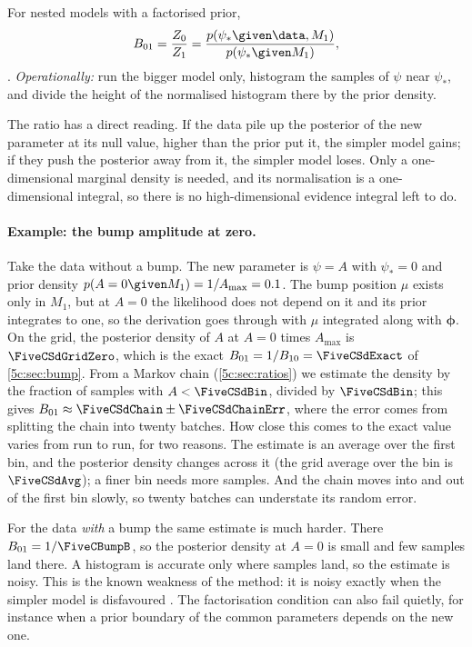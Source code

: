 \begin{workdef}
For nested models with a factorised prior,
\[
  B_{01}=\frac{Z_0}{Z_1}=\frac{p(\psi_*\given\data,M_1)}{p(\psi_*\given M_1)} ,
\]
. \emph{Operationally:} run the bigger model only,
histogram the samples of $\psi$ near $\psi_*$, and divide the height of the normalised
histogram there by the prior density.
\end{workdef}

The ratio has a direct reading. If the data pile up the posterior of the new parameter
at its null value, higher than the prior put it, the simpler model gains; if they push
the posterior away from it, the simpler model loses. Only a one-dimensional marginal
density is needed, and its normalisation is a one-dimensional integral, so there is no
high-dimensional evidence integral left to do.

\paragraph{Example: the bump amplitude at zero.}
Take the data without a bump. The new parameter is $\psi=A$ with $\psi_*=0$ and prior
density $p(A=0\given M_1)=1/A_{\max}=0.1$. The bump position $\mu$ exists only in $M_1$,
but at $A=0$ the likelihood does not depend on it and its prior integrates to one, so
the derivation goes through with $\mu$ integrated along with $\bm\phi$. On the grid,
the posterior density of $A$ at $A=0$ times $A_{\max}$ is $\FiveCSdGridZero$, which is the
exact $B_{01}=1/B_{10}=\FiveCSdExact$ of \cref{5c:sec:bump}. From a Markov chain
(\cref{5c:sec:ratios}) we estimate the density by the fraction of samples with
$A<\FiveCSdBin$, divided by $\FiveCSdBin$; this gives
$B_{01}\approx\FiveCSdChain\pm\FiveCSdChainErr$, where the error comes from splitting
the chain into twenty batches. How close this comes to the exact value varies from run
to run, for two reasons. The estimate is an average over the first bin, and the
posterior density changes across it (the grid average over the bin is
$\FiveCSdAvg$); a finer bin needs more samples. And the chain moves into and out of the
first bin slowly, so twenty batches can understate its random error.

For the data \emph{with} a bump the same estimate is much harder. There $B_{01}=1/\FiveCBumpB$,
so the posterior density at $A=0$ is small and few samples land there. A histogram is
accurate only where samples land, so the estimate is noisy. This is the known weakness
of the method: it is noisy exactly when the simpler model is disfavoured
. The factorisation condition can also fail quietly, for
instance when a prior boundary of the common parameters depends on the new one.

